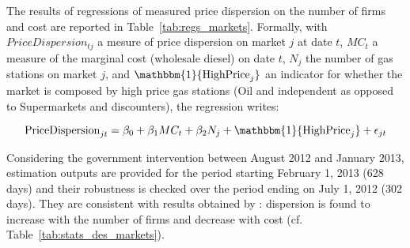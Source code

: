 \documentclass[english]{article}
\begin{document}
The results of regressions of measured price dispersion on the number of firms and cost are reported in Table~\ref{tab:regs_markets}. Formally, with $PriceDispersion_{tj}$ a mesure of price dispersion on market $j$ at date $t$, $MC_t$ a measure of the marginal cost (wholesale diesel) on date $t$, $N_j$ the number of gas stations on market $j$, and $\mathbbm{1}{\text{HighPrice}_{j}}$ an indicator for whether the market is composed by high price gas stations (Oil and independent as opposed to Supermarkets and discounters), the regression writes:

\begin{equation}
\text{PriceDispersion}_{jt}= \beta_0 + \beta_1 MC_t + \beta_2 N_j + \mathbbm{1}{\text{HighPrice}_{j}} + \epsilon_{jt}
\end{equation}

Considering the government intervention between August 2012 and January 2013, estimation outputs are provided for the period starting February 1, 2013 (628 days) and their robustness is checked over the period ending on July 1, 2012 (302 days). They are consistent with results obtained by \cite{TAP11}: dispersion is found to increase with the number of firms and decrease with cost (cf. Table~\ref{tab:stats_des_markets}).
\end{document}

